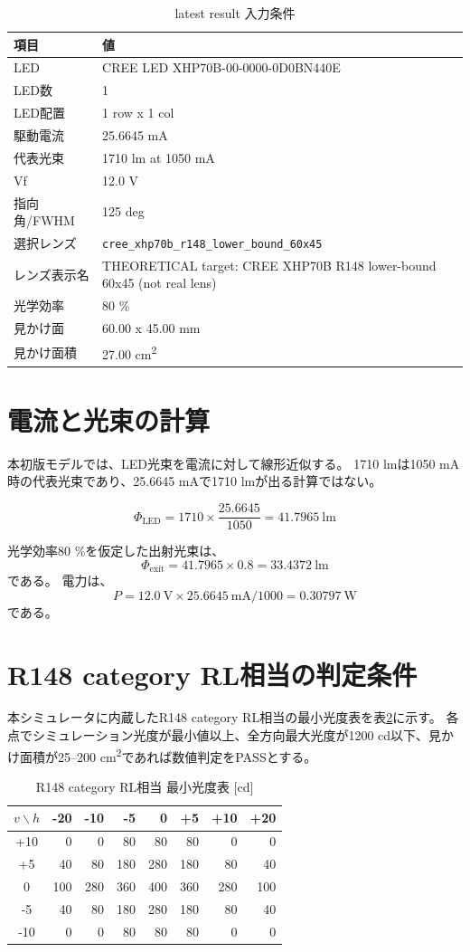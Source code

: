 \documentclass[11pt,a4paper]{article}
\newcommand{\code}[1]{\texttt{#1}}
\begin{document}
\begin{table}[H]
\centering
\caption{latest result 入力条件}
\label{tab:input}
\begin{tabular}{ll}
\toprule
項目 & 値\\
\midrule
LED & CREE LED XHP70B-00-0000-0D0BN440E\\
LED数 & 1\\
LED配置 & 1 row x 1 col\\
駆動電流 & 25.6645 mA\\
代表光束 & 1710 lm at 1050 mA\\
Vf & 12.0 V\\
指向角/FWHM & 125 deg\\
選択レンズ & \code{cree\_xhp70b\_r148\_lower\_bound\_60x45}\\
レンズ表示名 & THEORETICAL target: CREE XHP70B R148 lower-bound 60x45 (not real lens)\\
光学効率 & 80 \%\\
見かけ面 & 60.00 x 45.00 mm\\
見かけ面積 & 27.00 cm\textsuperscript{2}\\
\bottomrule
\end{tabular}
\end{table}

\section{電流と光束の計算}
本初版モデルでは、LED光束を電流に対して線形近似する。
1710 lmは1050 mA時の代表光束であり、25.6645 mAで1710 lmが出る計算ではない。

\[
\Phi_{\mathrm{LED}} =
1710
\times
\frac{25.6645}{1050}
= 41.7965\ \mathrm{lm}
\]

光学効率80 \%を仮定した出射光束は、
\[
\Phi_{\mathrm{exit}} =
41.7965 \times 0.8
= 33.4372\ \mathrm{lm}
\]
である。
電力は、
\[
P = 12.0\ \mathrm{V} \times 25.6645\ \mathrm{mA}/1000
= 0.30797\ \mathrm{W}
\]
である。

\section{R148 category RL相当の判定条件}
本シミュレータに内蔵したR148 category RL相当の最小光度表を表\ref{tab:r148min}に示す。
各点でシミュレーション光度が最小値以上、全方向最大光度が1200 cd以下、見かけ面積が25--200 cm\textsuperscript{2}であれば数値判定をPASSとする。

\begin{table}[H]
\centering
\caption{R148 category RL相当 最小光度表 [cd]}
\label{tab:r148min}
\begin{tabular}{c|rrrrrrr}
\toprule
$v \backslash h$ & -20 & -10 & -5 & 0 & +5 & +10 & +20\\
\midrule
+10 & 0 & 0 & 80 & 80 & 80 & 0 & 0\\
+5  & 40 & 80 & 180 & 280 & 180 & 80 & 40\\
0   & 100 & 280 & 360 & 400 & 360 & 280 & 100\\
-5  & 40 & 80 & 180 & 280 & 180 & 80 & 40\\
-10 & 0 & 0 & 80 & 80 & 80 & 0 & 0\\
\bottomrule
\end{tabular}
\end{table}
\end{document}
